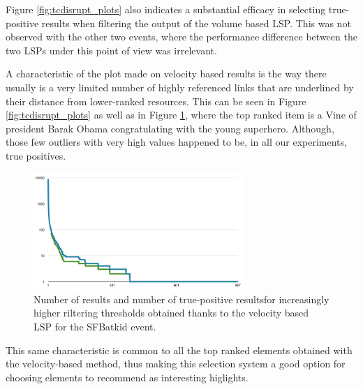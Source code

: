 \documentclass{sig-alternate}
\begin{document}
Figure \ref{fig:tcdisrupt_plots} also indicates a substantial efficacy in selecting true-positive results when filtering the output of the volume based LSP. This was not observed with the other two events, where the performance difference between the two LSPs under this point of view was irrelevant.

A characteristic of the plot made on velocity based results is the way there usually is a very limited number of highly referenced links that are underlined by their distance from lower-ranked resources. This can be seen in Figure \ref{fig:tcdisrupt_plots} as well as in Figure \ref{fig:sfbatkid_plot}, where the top ranked item is a Vine of president Barak Obama congratulating with the young superhero. Although, those few outliers with very high values happened to be, in all our experiments, true positives.
\begin{figure}[htbp]
  \centering
  \includegraphics[width=8cm]{Figures/batkid_plot.png}
  \caption{Number of results and number of true-positive resultsfor increasingly higher riltering thresholds obtained thanks to the velocity based LSP for the SFBatkid event.}
  \label{fig:sfbatkid_plot}
\end{figure}

This same characteristic is common to all the top ranked elements obtained with the velocity-based method, thus making this selection system a good option for choosing elements to recommend as interesting higlights.
\end{document}
